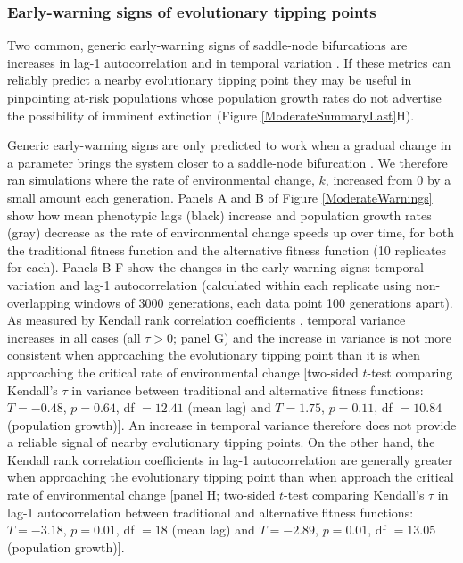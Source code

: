 \documentclass[12pt,letterpaper]{article} %
\begin{document}
\subsubsection*{Early-warning signs of evolutionary tipping points}

Two common, generic early-warning signs of saddle-node bifurcations are increases in lag-1 autocorrelation and in temporal variation \citep{Scheffer2009,Lenton2011}.
If these metrics can reliably predict a nearby evolutionary tipping point they may be useful in pinpointing at-risk populations whose population growth rates do not advertise the possibility of imminent extinction (Figure \ref{ModerateSummaryLast}H).

Generic early-warning signs are only predicted to work when a gradual change in a parameter brings the system closer to a saddle-node bifurcation \citep{Boettiger2012c}. 
We therefore ran simulations where the rate of environmental change, $k$, increased from 0 by a small amount each generation.
Panels A and B of Figure \ref{ModerateWarnings} show how mean phenotypic lags (black) increase and population growth rates (gray) decrease as the rate of environmental change speeds up over time, for both the traditional fitness function and the alternative fitness function (10 replicates for each).
Panels B-F show the changes in the early-warning signs: temporal variation and lag-1 autocorrelation (calculated within each replicate using non-overlapping windows of 3000 generations, each data point 100 generations apart).
As measured by Kendall rank correlation coefficients \citep{Dakos2008}, temporal variance increases in all cases (all $\tau>0$; panel G) and the increase in variance is not more consistent when approaching the evolutionary tipping point than it is when approaching the critical rate of environmental change [two-sided $t$-test comparing Kendall's $\tau$ in variance between traditional and alternative fitness functions: $T = -0.48$, $p = 0.64$, df $= 12.41$ (mean lag) and $T =1.75$, $p = 0.11$, df $=10.84$ (population growth)].
An increase in temporal variance therefore does not provide a reliable signal of nearby evolutionary tipping points.
On the other hand, the Kendall rank correlation coefficients in lag-1 autocorrelation are generally greater when approaching the evolutionary tipping point than when approach the critical rate of environmental change [panel H; two-sided $t$-test comparing Kendall's $\tau$ in lag-1 autocorrelation between traditional and alternative fitness functions: $T = -3.18$, $p = 0.01$, df $= 18$ (mean lag) and $T =-2.89$, $p = 0.01$, df $= 13.05$  (population growth)].
\end{document}
